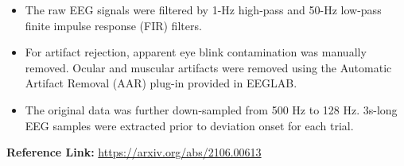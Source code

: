 \documentclass[letterpaper]{article}
\newcommand\textstyleListLabelx[1]{\textrm{#1}}
\begin{document}
\begin{itemize}[series=listWWNumv,label=\textstyleListLabelx{[F0B7?]}]
\item The raw EEG signals were filtered by 1-Hz high-pass and 50-Hz low-pass finite impulse response (FIR) filters.
\item For artifact rejection, apparent eye blink contamination was manually removed. Ocular and muscular artifacts were
removed using the Automatic Artifact Removal (AAR) plug-in provided in EEGLAB.
\item The original data was further down-sampled from 500 Hz to 128 Hz. 3s-long EEG samples were extracted prior to
deviation onset for each trial. 
\end{itemize}

\bigskip

\textbf{Reference Link:} \url{https://arxiv.org/abs/2106.00613}


\bigskip


\bigskip


\bigskip


\bigskip


\bigskip


\bigskip


\bigskip


\bigskip


\bigskip


\bigskip


\bigskip


\bigskip


\bigskip


\bigskip


\bigskip


\bigskip
\end{document}
